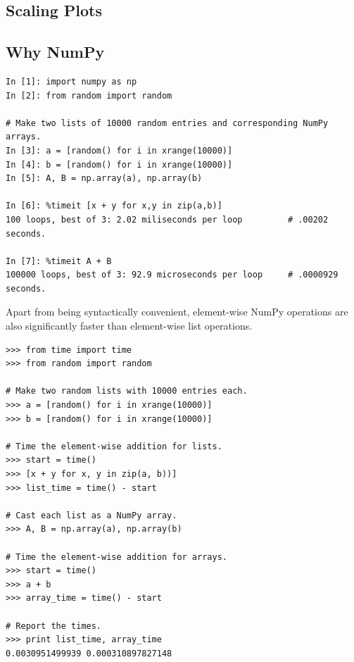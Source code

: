 \subsection*{Scaling Plots} %

\subsection*{Why NumPy} %


\begin{lstlisting}
In [1]: import numpy as np
In [2]: from random import random

# Make two lists of 10000 random entries and corresponding NumPy arrays.
In [3]: a = [random() for i in xrange(10000)]
In [4]: b = [random() for i in xrange(10000)]
In [5]: A, B = np.array(a), np.array(b)

In [6]: %timeit [x + y for x,y in zip(a,b)]
100 loops, best of 3: 2.02 miliseconds per loop         # .00202 seconds.

In [7]: %timeit A + B
100000 loops, best of 3: 92.9 microseconds per loop     # .0000929 seconds.
\end{lstlisting}

Apart from being syntactically convenient, element-wise NumPy operations are also significantly faster than element-wise list operations.

\begin{lstlisting}
>>> from time import time
>>> from random import random

# Make two random lists with 10000 entries each.
>>> a = [random() for i in xrange(10000)]
>>> b = [random() for i in xrange(10000)]

# Time the element-wise addition for lists.
>>> start = time()
>>> [x + y for x, y in zip(a, b))]
>>> list_time = time() - start

# Cast each list as a NumPy array.
>>> A, B = np.array(a), np.array(b)

# Time the element-wise addition for arrays.
>>> start = time()
>>> a + b
>>> array_time = time() - start

# Report the times.
>>> print list_time, array_time
0.0030951499939 0.000310897827148
\end{lstlisting}

